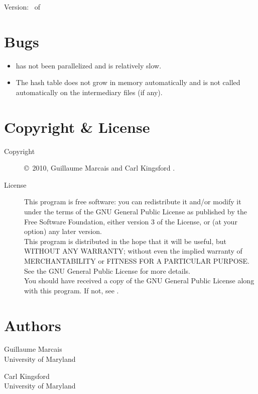 \documentclass[english]{article}
\begin{document}
Version: \Version\ of \Date

\section{Bugs}

\begin{itemize}
\item {} has not been parallelized and is
  relatively slow.
\item The hash table does not grow in memory automatically and
   is not called automatically on the
  intermediary files (if any).
\end{itemize}

\section{Copyright \& License}
\begin{description}
\item[Copyright] \copyright\ 2010, Guillaume Marcais  and Carl Kingsford .

\item[License] This program is free software: you can redistribute it
  and/or modify it under the terms of the GNU General Public License
  as published by the Free Software Foundation, either version 3 of
  the License, or (at your option) any later version. \\
  This program is distributed in the hope that it will be useful, but
  WITHOUT ANY WARRANTY; without even the implied warranty of
  MERCHANTABILITY or FITNESS FOR A PARTICULAR PURPOSE.  See the GNU
  General Public License for more details. \\
  You should have received a copy of the GNU General Public License
  along with this program.  If not, see
  . 
\end{description}

\section{Authors}
\noindent
Guillaume Marcais \\
University of Maryland \\

\noindent
Carl Kingsford \\
University of Maryland \\

\LatexManEnd
\end{document}
